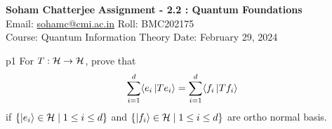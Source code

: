 \documentclass[a4paper, 11pt]{article}
\begin{document}
	
	
	\textsf{\noindent \large\textbf{Soham Chatterjee} \hfill \textbf{Assignment - 2.2 : Quantum Foundations}\\
		Email: \href{sohamc@cmi.ac.in}{sohamc@cmi.ac.in} \hfill Roll: BMC202175\\
		\normalsize Course: Quantum Information Theory \hfill Date: February 29, 2024}
	
	
	\begin{problem}{%
		}{p1%
		}
For $T:\mathcal{H}\to \mathcal{H}$, prove that  $$\sum_{i=1}^d\langle e_i\ket{Te_i}=\sum_{i=1}^d \langle f_i\ket{Tf_i}$$if $\{\ket{e_i}\in \mathcal{H}\mid 1\leq i\leq d\}$ and $\{\ket{f_i}\in \mathcal{H}\mid 1\leq i\leq d\}$ are ortho normal basis.
	\end{problem}
	
\end{document}
